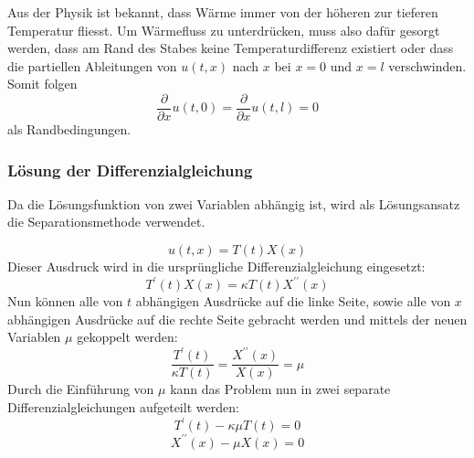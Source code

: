 Aus der Physik ist bekannt, dass Wärme immer von der höheren zur tieferen
Temperatur fliesst. Um Wärmefluss zu unterdrücken, muss also dafür gesorgt
werden, dass am Rand des Stabes keine Temperaturdifferenz existiert oder 
dass die partiellen Ableitungen von $u(t,x)$ nach $x$ bei $x = 0$ und $x = l$
verschwinden. Somit folgen
\[
    \frac{\partial}{\partial x} u(t, 0)
    =
    \frac{\partial}{\partial x} u(t, l)
    =
    0
\]
als Randbedingungen.


\subsubsection{Lösung der Differenzialgleichung}


Da die Lösungsfunktion von zwei Variablen abhängig ist, wird als Lösungsansatz
die Separationsmethode verwendet.

\[
    u(t,x)
    =
    T(t)X(x)
\]
Dieser Ausdruck wird in die ursprüngliche Differenzialgleichung eingesetzt:
\[
    T^{\prime}(t)X(x)
    =
    \kappa T(t)X^{\prime \prime}(x)
\]
Nun können alle von $t$ abhängigen Ausdrücke auf die linke Seite, sowie alle
von $x$ abhängigen Ausdrücke auf die rechte Seite gebracht werden und mittels
der neuen Variablen $\mu$ gekoppelt werden:
\[
    \frac{T^{\prime}(t)}{\kappa T(t)}
    =
    \frac{X^{\prime \prime}(x)}{X(x)}
    =
    \mu
\]
Durch die Einführung von $\mu$ kann das Problem nun in zwei separate
Differenzialgleichungen aufgeteilt werden:
\[
    T^{\prime}(t) - \kappa \mu T(t)
    =
    0
\]
\[
    X^{\prime \prime}(x) - \mu X(x)
    =
    0
\]
